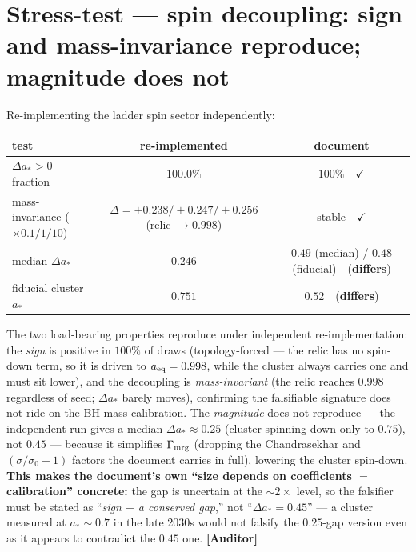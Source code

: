 \documentclass[11pt]{article}
\newcommand{\Auditor}{\textbf{\textcolor{teal!55!black}{[Auditor]}}}
\begin{document}
\section{Stress-test --- spin decoupling: sign and mass-invariance reproduce; magnitude does not}
Re-implementing the ladder spin sector independently:
\begin{center}\small
\begin{tabular}{@{}lcc@{}}
\toprule
test & re-implemented & document \\
\midrule
$\Delta a_\ast>0$ fraction & $100.0\%$ & $100\%$\ \ $\checkmark$ \\
mass-invariance ($\times0.1/1/10$) & $\Delta=+0.238/{+}0.247/{+}0.256$ (relic $\to0.998$) & stable\ \ $\checkmark$ \\
median $\Delta a_\ast$ & $0.246$ & $0.49$ (median) / $0.48$ (fiducial)\ \ (\textbf{differs}) \\
fiducial cluster $a_\ast$ & $0.751$ & $0.52$\ \ (\textbf{differs}) \\
\bottomrule
\end{tabular}
\end{center}
The two load-bearing properties reproduce under independent re-implementation: the \emph{sign} is positive in $100\%$ of draws (topology-forced --- the relic has no spin-down term, so it is driven to $a_{\rm eq}=0.998$, while the cluster always carries one and must sit lower), and the decoupling is \emph{mass-invariant} (the relic reaches $0.998$ regardless of seed; $\Delta a_\ast$ barely moves), confirming the falsifiable signature does not ride on the BH-mass calibration. The \emph{magnitude} does not reproduce --- the independent run gives a median $\Delta a_\ast\approx0.25$ (cluster spinning down only to $0.75$), not $0.45$ --- because it simplifies $\Gamma_{\rm mrg}$ (dropping the Chandrasekhar and $(\sigma/\sigma_0-1)$ factors the document carries in full), lowering the cluster spin-down. \textbf{This makes the document's own ``size depends on coefficients $=$ calibration'' concrete:} the gap is uncertain at the $\sim2\times$ level, so the falsifier must be stated as ``\emph{sign $+$ a conserved gap},'' not ``$\Delta a_\ast=0.45$'' --- a cluster measured at $a_\ast\sim0.7$ in the late 2030s would not falsify the $0.25$-gap version even as it appears to contradict the $0.45$ one. \Auditor
\end{document}
